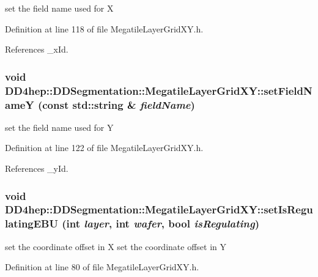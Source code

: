 set the field name used for X 

Definition at line 118 of file MegatileLayerGridXY.h.

References \_\-xId.\hypertarget{class_d_d4hep_1_1_d_d_segmentation_1_1_megatile_layer_grid_x_y_a19e5ddea2f004ff1b991f16cff99648b}{
\subsubsection[{setFieldNameY}]{\setlength{\rightskip}{0pt plus 5cm}void DD4hep::DDSegmentation::MegatileLayerGridXY::setFieldNameY (const std::string \& {\em fieldName})}}
\label{class_d_d4hep_1_1_d_d_segmentation_1_1_megatile_layer_grid_x_y_a19e5ddea2f004ff1b991f16cff99648b}


set the field name used for Y 

Definition at line 122 of file MegatileLayerGridXY.h.

References \_\-yId.\hypertarget{class_d_d4hep_1_1_d_d_segmentation_1_1_megatile_layer_grid_x_y_a7d696e7cba091370935d23b62c79ae9c}{
\subsubsection[{setIsRegulatingEBU}]{\setlength{\rightskip}{0pt plus 5cm}void DD4hep::DDSegmentation::MegatileLayerGridXY::setIsRegulatingEBU (int {\em layer}, \/  int {\em wafer}, \/  bool {\em isRegulating})}}
\label{class_d_d4hep_1_1_d_d_segmentation_1_1_megatile_layer_grid_x_y_a7d696e7cba091370935d23b62c79ae9c}


set the coordinate offset in X set the coordinate offset in Y 

Definition at line 80 of file MegatileLayerGridXY.h.


